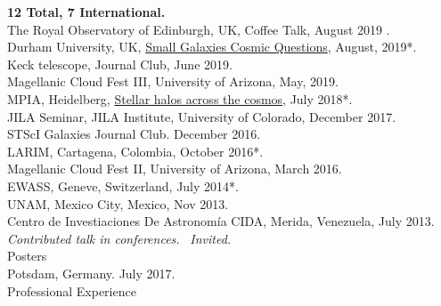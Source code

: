 \documentclass[UTF8]{article}
\begin{document}
\indent \indent \textbf{12 Total, 7 International.}\\
\indent\indent The Royal Observatory of Edinburgh, UK, Coffee Talk, August 2019 \dag.\\
\indent\indent Durham University, UK, \href{http://astro.dur.ac.uk/cosmodwarfs/}{Small Galaxies Cosmic Questions}, August, 2019*.\\
\indent\indent Keck telescope, Journal Club, June 2019.\\
\indent\indent Magellanic Cloud Fest III, University of Arizona, May, 2019.\\
\indent\indent MPIA, Heidelberg, \href{http://www.mpia.de/homes/stellarhalos2018-loc/sh2018/index.html}{Stellar halos across the cosmos}, July 2018*.\\
\indent\indent JILA Seminar, JILA Institute, University of Colorado, December 2017.\\
\indent\indent STScI Galaxies Journal Club. December 2016.\\
\indent\indent LARIM, Cartagena, Colombia, October 2016*.\\
\indent\indent Magellanic Cloud Fest II, University of Arizona, March 2016.\\
\indent\indent EWASS, Geneve, Switzerland, July 2014*.\\
\indent\indent UNAM, Mexico City, Mexico, Nov 2013. \\
\indent\indent Centro de Investiaciones De Astronom\'ia CIDA, Merida, Venezuela, July 2013.\\

\indent\indent * \textit{Contributed talk in conferences.}
\indent\indent\ \dag \textit{Invited.} \\

{\Large Posters}\\

\indent\indent Potsdam, Germany. July 2017.\\


{\Large {Professional Experience}}\\

\end{document}
